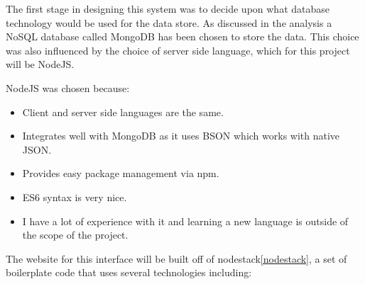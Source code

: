The first stage in designing this system was to decide upon what database technology would be used for the data store. As discussed in the analysis a NoSQL database called MongoDB has been chosen to store the data. This choice was also influenced by the choice of server side language, which for this project will be NodeJS. 

NodeJS was chosen because:

\begin{itemize}
  \item Client and server side languages are the same.
  \item Integrates well with MongoDB as it uses BSON which works with native JSON.
  \item Provides easy package management via npm.
  \item ES6 syntax is very nice.
  \item I have a lot of experience with it and learning a new language is outside of the scope of the project.
\end{itemize}

The website for this interface will be built off of nodestack\ref{nodestack}, a set of boilerplate code that uses several technologies including:


